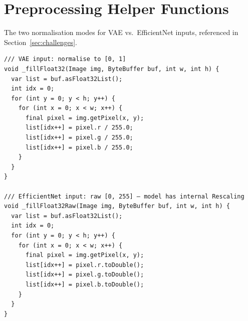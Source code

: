\section{Preprocessing Helper Functions}
\label{app:preprocessing}

The two normalisation modes for VAE vs.\ EfficientNet inputs, referenced in Section~\ref{sec:challenges}.

\begin{verbatim}
/// VAE input: normalise to [0, 1]
void _fillFloat32(Image img, ByteBuffer buf, int w, int h) {
  var list = buf.asFloat32List();
  int idx = 0;
  for (int y = 0; y < h; y++) {
    for (int x = 0; x < w; x++) {
      final pixel = img.getPixel(x, y);
      list[idx++] = pixel.r / 255.0;
      list[idx++] = pixel.g / 255.0;
      list[idx++] = pixel.b / 255.0;
    }
  }
}

/// EfficientNet input: raw [0, 255] — model has internal Rescaling
void _fillFloat32Raw(Image img, ByteBuffer buf, int w, int h) {
  var list = buf.asFloat32List();
  int idx = 0;
  for (int y = 0; y < h; y++) {
    for (int x = 0; x < w; x++) {
      final pixel = img.getPixel(x, y);
      list[idx++] = pixel.r.toDouble();
      list[idx++] = pixel.g.toDouble();
      list[idx++] = pixel.b.toDouble();
    }
  }
}
\end{verbatim}
